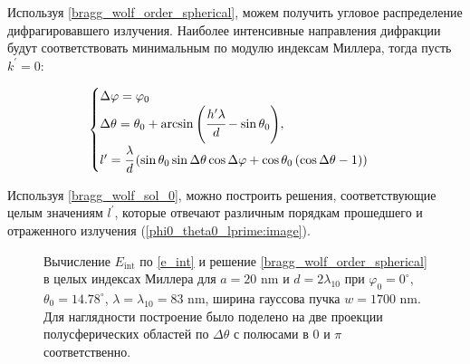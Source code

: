 
Используя \autoref{bragg_wolf_order_spherical}, можем получить угловое распределение дифрагировавшего излучения. Наиболее интенсивные направления дифракции будут соответствовать минимальным по модулю индексам Миллера, тогда пусть $k^\prime = 0$:

    \begin{equation}
        \begin{cases}
            \Delta \varphi = \varphi_0
            \\
            \Delta \theta = \theta_0 + \arcsin{\left( \cfrac{h^{\prime} \lambda}{d} - \sin{\theta_0} \right)},
            \\
            l^{\prime} = \cfrac{\lambda}{d}\left(\sin{\theta_0}\sin{\Delta \theta}\cos{\Delta \varphi} + \cos{\theta_0} \left( \cos{\Delta \theta} - 1 \right)\right)
        \end{cases}
        \label{bragg_wolf_sol_0}
    \end{equation}

Используя \autoref{bragg_wolf_sol_0}, можно построить решения, соответствующие целым значениям $l^\prime$, которые отвечают различным порядкам прошедшего и отраженного излучения (\autoref{phi0_theta0_lprime:image}).

    \begin{figure}[ht]
        \hfil
        \hfil
        \caption{Вычисление $E_{\textrm{int}}$ по \autoref{e_int} и решение \autoref{bragg_wolf_order_spherical} в целых индексах Миллера для $a = 20$ nm и $d = 2\lambda_{10}$ при $\varphi_0 = 0^{\circ}$, $\theta_0 = 14.78^{\circ}$, $\lambda = \lambda_{10} = 83$ nm, ширина гауссова пучка $w = 1700$ nm. Для наглядности построение было поделено на две проекции полусферических областей по $\Delta \theta$ с полюсами в $0$ и $\pi$ соответственно.}\label{1st_check_diffrth:image}
    \end{figure}

